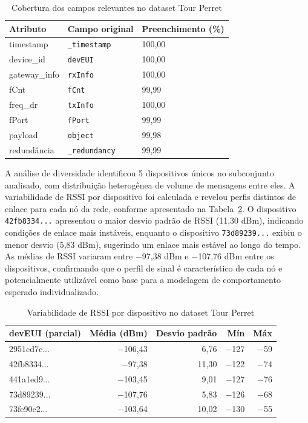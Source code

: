 \begin{table}[htb]
\centering
\caption{Cobertura dos campos relevantes no dataset Tour Perret}
\label{tab:cobertura_tourperret}
\begin{tabular}{lll}
\hline
\textbf{Atributo} & \textbf{Campo original} & \textbf{Preenchimento (\%)} \\
\hline
timestamp    & \texttt{\_timestamp}  & 100,00 \\
device\_id   & \texttt{devEUI}       & 100,00 \\
gateway\_info & \texttt{rxInfo}      & 100,00 \\
fCnt         & \texttt{fCnt}         & 99,99  \\
freq\_dr     & \texttt{txInfo}       & 100,00 \\
fPort        & \texttt{fPort}        & 99,99  \\
payload      & \texttt{object}       & 99,98  \\
redundância  & \texttt{\_redundancy} & 99,99  \\
\hline
\end{tabular}
\end{table}

A análise de diversidade identificou 5 dispositivos únicos no subconjunto 
analisado, com distribuição heterogênea de volume de mensagens entre eles. 
A variabilidade de RSSI por dispositivo foi calculada e revelou perfis 
distintos de enlace para cada nó da rede, conforme apresentado na 
Tabela~\ref{tab:rssi_dispositivos}. O dispositivo \texttt{42fb8334...} 
apresentou o maior desvio padrão de RSSI (11,30 dBm), indicando condições 
de enlace mais instáveis, enquanto o dispositivo \texttt{73d89239...} exibiu 
o menor desvio (5,83 dBm), sugerindo um enlace mais estável ao longo do 
tempo. As médias de RSSI variaram entre $-$97,38 dBm e $-$107,76 dBm entre 
os dispositivos, confirmando que o perfil de sinal é característico de cada 
nó e potencialmente utilizável como base para a modelagem de comportamento 
esperado individualizado.

\begin{table}[htb]
\centering
\caption{Variabilidade de RSSI por dispositivo no dataset Tour Perret}
\label{tab:rssi_dispositivos}
\begin{tabular}{lrrrr}
\hline
\textbf{devEUI (parcial)} & \textbf{Média (dBm)} & \textbf{Desvio padrão} & 
\textbf{Mín} & \textbf{Máx} \\
\hline
2951cd7c... & $-$106,43 & 6,76  & $-$127 & $-$59 \\
42fb8334... & $-$97,38  & 11,30 & $-$122 & $-$74 \\
441a1ed9... & $-$103,45 & 9,01  & $-$127 & $-$76 \\
73d89239... & $-$107,76 & 5,83  & $-$126 & $-$68 \\
73fe90c2... & $-$103,64 & 10,02 & $-$130 & $-$55 \\
\hline
\end{tabular}
\end{table}

